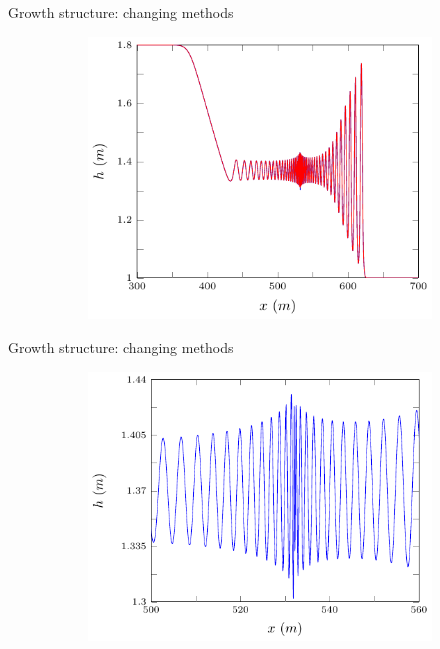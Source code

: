 \documentclass[pdf]{beamer}
\begin{document}
\begin{frame}{Growth structure: changing methods}
	\begin{figure}
		\begin{subfigure}{0.75\textwidth}
			\includegraphics[width=\textwidth]{../Pics/Models/all/1-figure0.pdf}
		\end{subfigure}
	\end{figure}
\end{frame}

\begin{frame}{Growth structure: changing methods}
	\begin{figure}
		\begin{subfigure}{0.75\textwidth}
			\includegraphics[width=\textwidth]{../Pics/Models/FD/2-figure0.pdf}
		\end{subfigure}
	\end{figure}
\end{frame}
\end{document}
